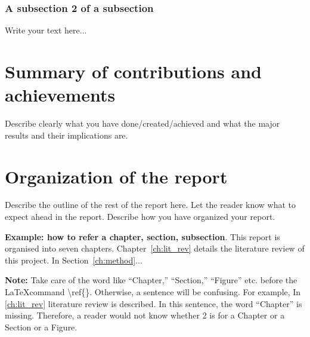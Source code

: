 \subsubsection{A subsection 2 of a subsection}
\label{sec:intro_some_subsub2}
Write your text here...

\section{Summary of contributions and achievements} %
\label{sec:intro_sum_results} %
Describe clearly what you have done/created/achieved and what the major results and their implications are. 


\section{Organization of the report} %
\label{sec:intro_org} %
Describe the outline of the rest of the report here. Let the reader know what to expect ahead in the report. Describe how you have organized your report. 

\textbf{Example: how to refer a chapter, section, subsection}. This report is organised into seven chapters. Chapter~\ref{ch:lit_rev} details the literature review of this project. In Section~\ref{ch:method}...  %

\textbf{Note:}  Take care of the word like ``Chapter,'' ``Section,'' ``Figure'' etc. before the \LaTeX command \textbackslash ref\{\}. Otherwise, a  sentence will be confusing. For example, In \ref{ch:lit_rev} literature review is described. In this sentence, the word ``Chapter'' is missing. Therefore, a reader would not know whether 2 is for a Chapter or a Section or a Figure.

